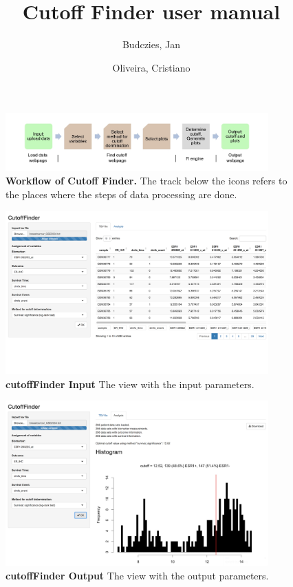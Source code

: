 \documentclass[12pt, a4paper]{article}
\title{Cutoff Finder user manual}
\author{
  Budczies, Jan
  \and
  Oliveira, Cristiano
}
\begin{document}
\maketitle

\vspace{0.5cm}

\tableofcontents


\newpage

\begin{figure}[t]
\centering
\includegraphics[width=0.9\textwidth]{fig1_workflow}
\caption{\textbf{Workflow of Cutoff Finder.} The track below the icons refers to the places where the steps of data processing are done.}
\label{fig:workflow}
\end{figure}

\begin{figure}[t]
\centering
\includegraphics[width=0.9\textwidth]{cutoffFinderInput}
\caption{\textbf{cutoffFinder Input} The view with the input parameters.}
\label{fig:cutoffFinderInput}
\end{figure}

\begin{figure}[t]
\centering
\includegraphics[width=0.9\textwidth]{cutoffFinderOutput}
\caption{\textbf{cutoffFinder Output} The view with the output parameters.}
\label{fig:cutoffFinderOutput}
\end{figure}
\end{document}
